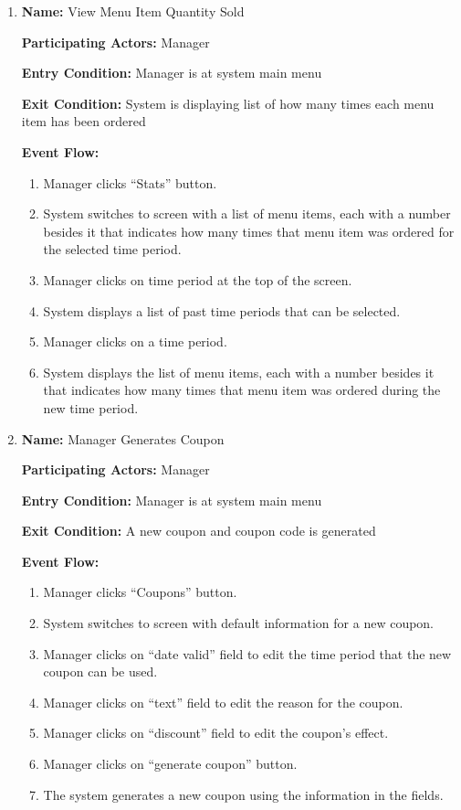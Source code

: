 \documentclass[11pt]{article}
\begin{document}
\begin{enumerate}
		\newpage

		\item \textbf{Name:} 				View Menu Item Quantity Sold

			\textbf{Participating Actors:} 	Manager

			\textbf{Entry Condition:} 		Manager is at system main menu

			\textbf{Exit Condition:} 		System is displaying list of how many times each menu item has been ordered

			\textbf{Event Flow:}
			\begin{enumerate}
				\setlength{\leftskip}{1cm}
				\item Manager clicks “Stats” button.
				\item System switches to screen with a list of menu items, each with a number besides it that indicates how many times that menu item was ordered for the selected time period.
				\item Manager clicks on time period at the top of the screen.
				\item System displays a list of past time periods that can be selected.
				\item Manager clicks on a time period.
				\item System displays the list of menu items, each with a number besides it that indicates how many times that menu item was ordered during the new time period. \\
			\end{enumerate}

		\item \textbf{Name:} 				Manager Generates Coupon

			\textbf{Participating Actors:} 	Manager

			\textbf{Entry Condition:} 		Manager is at system main menu

			\textbf{Exit Condition:} 		A new coupon and coupon code is generated

			\textbf{Event Flow:}
			\begin{enumerate}
				\setlength{\leftskip}{1cm}
				\item Manager clicks ``Coupons'' button.
				\item System switches to screen with default information for a new coupon.
				\item Manager clicks on ``date valid'' field to edit the time period that the new coupon can be used.
				\item Manager clicks on ``text'' field to edit the reason for the coupon.
				\item Manager clicks on ``discount'' field to edit the coupon’s effect.
				\item Manager clicks on ``generate coupon'' button.
				\item The system generates a new coupon using the information in the fields.\\
			\end{enumerate}


\end{enumerate}
\end{document}
